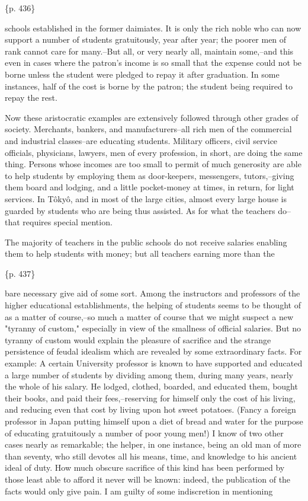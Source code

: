 \{p. 436\}

schools established in the former daimiates. It is only the rich noble who can now support a number of students gratuitously, year after year; the poorer men of rank cannot care for many.--But all, or very nearly all, maintain some,--and this even in cases where the patron's income is so small that the expense could not be borne unless the student were pledged to repay it after graduation. In some instances, half of the cost is borne by the patron; the student being required to repay the rest.

Now these aristocratic examples are extensively followed through other grades of society. Merchants, bankers, and manufacturers--all rich men of the commercial and industrial classes--are educating students. Military officers, civil service officials, physicians, lawyers, men of every profession, in short, are doing the same thing. Persons whose incomes are too small to permit of much generosity are able to help students by employing them as door-keepers, messengers, tutors,--giving them board and lodging, and a little pocket-money at times, in return, for light services. In Tôkyô, and in most of the large cities, almost every large house is guarded by students who are being thus assisted. As for what the teachers do--that requires special mention.

The majority of teachers in the public schools do not receive salaries enabling them to help students with money; but all teachers earning more than the

\{p. 437\}

bare necessary give aid of some sort. Among the instructors and professors of the higher educational establishments, the helping of students seems to be thought of as a matter of course,--so much a matter of course that we might suspect a new "tyranny of custom," especially in view of the smallness of official salaries. But no tyranny of custom would explain the pleasure of sacrifice and the strange persistence of feudal idealism which are revealed by some extraordinary facts. For example: A certain University professor is known to have supported and educated a large number of students by dividing among them, during many years, nearly the whole of his salary. He lodged, clothed, boarded, and educated them, bought their books, and paid their fees,--reserving for himself only the cost of his living, and reducing even that cost by living upon hot sweet potatoes. (Fancy a foreign professor in Japan putting himself upon a diet of bread and water for the purpose of educating gratuitously a number of poor young men!) I know of two other cases nearly as remarkable; the helper, in one instance, being an old man of more than seventy, who still devotes all his means, time, and knowledge to his ancient ideal of duty. How much obscure sacrifice of this kind has been performed by those least able to afford it never will be known: indeed, the publication of the facts would only give pain. I am guilty of some indiscretion in mentioning

